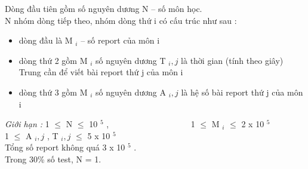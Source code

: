 Dòng đầu tiên gồm số nguyên dương N – số môn học.
\\N nhóm dòng tiếp theo, nhóm dòng thứ i có cấu trúc như sau :
\begin{itemize}
	\item dòng đầu là M $_ i $ – số report của môn i
	\item dòng thứ 2 gồm M $_ i $ số nguyên dương T $_ i,j $ là thời gian (tính theo giây) Trung cần để viết bài report thứ j của môn i
	\item dòng thứ 3 gồm M $_ i $ số nguyên dương A $_ i,j $ là hệ số bài report thứ j của môn i
\end{itemize}

\emph{Giới hạn : } 1  $\le$  N  $\le$  10 $^ 5 $ ,                    1  $\le$  M $_ i $  $\le$  2 x 10 $^ 5 $
\\1  $\le$  A $_ i,j $ , T $_ i,j $  $\le$  5 x 10 $^ 5 $
\\Tổng số report không quá 3 x 10 $^ 5 $ .
\\Trong 30\% số test, N = 1.